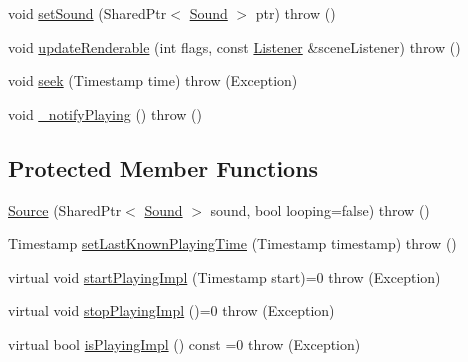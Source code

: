 \begin{DoxyCompactItemize}
\item 
void \hyperlink{classAudio_1_1Source_a48a9992621c4825b28552c381b449b8d}{set\+Sound} (Shared\+Ptr$<$ \hyperlink{classAudio_1_1Sound}{Sound} $>$ ptr)  throw ()
\item 
void \hyperlink{classAudio_1_1Source_acfd8ea3281104dbfe90a6ffcc8af9c2c}{update\+Renderable} (int flags, const \hyperlink{classAudio_1_1Listener}{Listener} \&scene\+Listener)  throw ()
\item 
void \hyperlink{classAudio_1_1Source_aa5bf151683c32dd60fea4c75e6176102}{seek} (Timestamp time)  throw (\+Exception)
\item 
void \hyperlink{classAudio_1_1Source_a17f973fb4f46e3e489b770a49e3186fa}{\+\_\+notify\+Playing} ()  throw ()
\end{DoxyCompactItemize}
\subsection*{Protected Member Functions}
\begin{DoxyCompactItemize}
\item 
\hyperlink{classAudio_1_1Source_ad2d141a6ef474cf20f3bddce2eead392}{Source} (Shared\+Ptr$<$ \hyperlink{classAudio_1_1Sound}{Sound} $>$ sound, bool looping=false)  throw ()
\item 
Timestamp \hyperlink{classAudio_1_1Source_a80bb4782218d1ea593ce3f1db3bfbf58}{set\+Last\+Known\+Playing\+Time} (Timestamp timestamp)  throw ()
\item 
virtual void \hyperlink{classAudio_1_1Source_ac0ae6f4f2c2e568a18bf3627b755922e}{start\+Playing\+Impl} (Timestamp start)=0  throw (\+Exception)
\item 
virtual void \hyperlink{classAudio_1_1Source_ac91bbbcdfac9f75e31143ed8ce721f64}{stop\+Playing\+Impl} ()=0  throw (\+Exception)
\item 
virtual bool \hyperlink{classAudio_1_1Source_ab9f6505b3317358970cd16f2b1469ea9}{is\+Playing\+Impl} () const =0  throw (\+Exception)
\end{DoxyCompactItemize}

